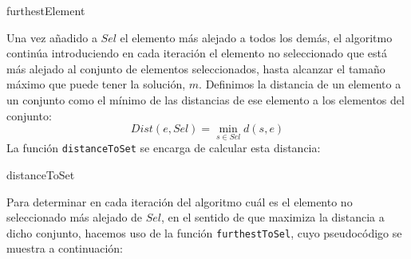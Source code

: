 \documentclass[11pt,a4paper]{article}
\begin{document}
	\begin{algorithm}[H]
		\caption{\sc furthestElement}
	\end{algorithm}
	
	Una vez añadido a $Sel$ el elemento más alejado a todos los demás, el algoritmo continúa introduciendo en cada iteración el elemento no seleccionado que está más alejado al conjunto de elementos seleccionados, hasta alcanzar el tamaño máximo que puede tener la solución, $m$. Definimos la distancia de un elemento a un conjunto como el mínimo de las distancias de ese elemento a los elementos del conjunto:
	$$ Dist(e,Sel)=\min_{s \in Sel} d(s,e) $$
	La función \lstinline|distanceToSet| se encarga de calcular esta distancia:
	
		\begin{algorithm}[H]
		\caption{\sc distanceToSet}
		\end{algorithm}
	 
	 Para determinar en cada iteración del algoritmo cuál es el elemento no seleccionado más alejado de $Sel$, en el sentido de que maximiza la distancia a dicho conjunto, hacemos uso de la función \lstinline|furthestToSel|, cuyo pseudocódigo se muestra a continuación:
 
\end{document}
